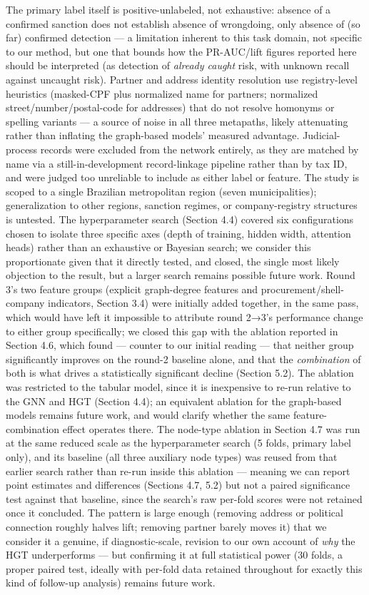 \documentclass[11pt,]{article}
\begin{document}
The primary label itself is positive-unlabeled, not exhaustive: absence
of a confirmed sanction does not establish absence of wrongdoing, only
absence of (so far) confirmed detection --- a limitation inherent to
this task domain, not specific to our method, but one that bounds how
the PR-AUC/lift figures reported here should be interpreted (as
detection of \emph{already caught} risk, with unknown recall against
uncaught risk). Partner and address identity resolution use
registry-level heuristics (masked-CPF plus normalized name for partners;
normalized street/number/postal-code for addresses) that do not resolve
homonyms or spelling variants --- a source of noise in all three
metapaths, likely attenuating rather than inflating the graph-based
models' measured advantage. Judicial-process records were excluded from
the network entirely, as they are matched by name via a
still-in-development record-linkage pipeline rather than by tax ID, and
were judged too unreliable to include as either label or feature. The
study is scoped to a single Brazilian metropolitan region (seven
municipalities); generalization to other regions, sanction regimes, or
company-registry structures is untested. The hyperparameter search
(Section 4.4) covered six configurations chosen to isolate three
specific axes (depth of training, hidden width, attention heads) rather
than an exhaustive or Bayesian search; we consider this proportionate
given that it directly tested, and closed, the single most likely
objection to the result, but a larger search remains possible future
work. Round 3's two feature groups (explicit graph-degree features and
procurement/shell-company indicators, Section 3.4) were initially added
together, in the same pass, which would have left it impossible to
attribute round 2→3's performance change to either group specifically;
we closed this gap with the ablation reported in Section 4.6, which
found --- counter to our initial reading --- that neither group
significantly improves on the round-2 baseline alone, and that the
\emph{combination} of both is what drives a statistically significant
decline (Section 5.2). The ablation was restricted to the tabular model,
since it is inexpensive to re-run relative to the GNN and HGT (Section
4.4); an equivalent ablation for the graph-based models remains future
work, and would clarify whether the same feature-combination effect
operates there. The node-type ablation in Section 4.7 was run at the
same reduced scale as the hyperparameter search (5 folds, primary label
only), and its baseline (all three auxiliary node types) was reused from
that earlier search rather than re-run inside this ablation --- meaning
we can report point estimates and differences (Sections 4.7, 5.2) but
not a paired significance test against that baseline, since the search's
raw per-fold scores were not retained once it concluded. The pattern is
large enough (removing address or political connection roughly halves
lift; removing partner barely moves it) that we consider it a genuine,
if diagnostic-scale, revision to our own account of \emph{why} the HGT
underperforms --- but confirming it at full statistical power (30 folds,
a proper paired test, ideally with per-fold data retained throughout for
exactly this kind of follow-up analysis) remains future work.
\end{document}
